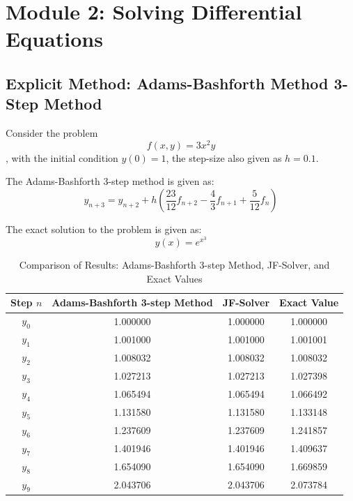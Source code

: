 \section{Module 2: Solving Differential Equations}

\subsection{Explicit Method: Adams-Bashforth Method 3-Step Method}
Consider the problem \begin{equation}
    f(x,y) = 3x^2y
\end{equation}, with the initial condition $y(0) = 1$, the step-size also given as $h = 0.1$.

The Adams-Bashforth 3-step method is given as:
\begin{equation}
    y_{n+3}  = y_{n+2} + h \left(\frac{23}{12}f_{n+2} - \frac{4}{3}f_{n+1} + \frac{5}{12}f_{n}\right)
\end{equation}

The exact solution to the problem is given as:
\begin{equation}
    y(x) = e^{x^3}
\end{equation}




\begin{table}[htbp]
    \centering
    \begin{tabular}{|c|c|c|c|}
        \hline
        Step $n$ & Adams-Bashforth 3-step Method & JF-Solver & Exact Value \\
        \hline
        $y_0$ & 1.000000 & 1.000000 & 1.000000 \\
        $y_1$ & 1.001000 & 1.001000 & 1.001001 \\
        $y_2$ & 1.008032 & 1.008032 & 1.008032 \\
        $y_3$ & 1.027213 & 1.027213 & 1.027398 \\
        $y_4$ & 1.065494 & 1.065494 & 1.066492 \\
        $y_5$ & 1.131580 & 1.131580 & 1.133148 \\
        $y_6$ & 1.237609 & 1.237609 & 1.241857 \\
        $y_7$ & 1.401946 & 1.401946 & 1.409637 \\
        $y_8$ & 1.654090 & 1.654090 & 1.669859 \\
        $y_9$ & 2.043706 & 2.043706 & 2.073784 \\
        \hline
    \end{tabular}
    \caption{Comparison of Results: Adams-Bashforth 3-step Method, JF-Solver, and Exact Values}
    \label{tab:comparison}
\end{table}


